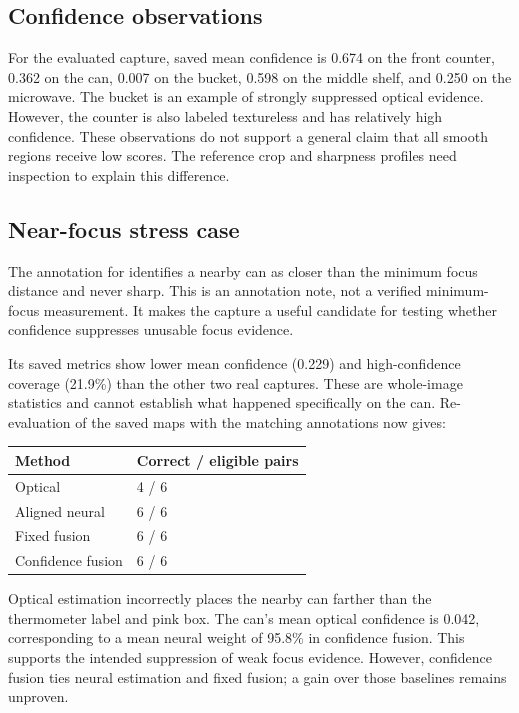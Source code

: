 \documentclass[11pt]{article}
\begin{document}
\subsection{Confidence observations}

For the evaluated capture, saved mean confidence is 0.674 on the front counter, 0.362 on the can, 0.007 on the bucket, 0.598 on the middle shelf, and 0.250 on the microwave. The bucket is an example of strongly suppressed optical evidence. However, the counter is also labeled textureless and has relatively high confidence. These observations do not support a general claim that all smooth regions receive low scores. The reference crop and sharpness profiles need inspection to explain this difference.

\subsection{Near-focus stress case}

The annotation for  identifies a nearby can as closer than the minimum focus distance and never sharp. This is an annotation note, not a verified minimum-focus measurement. It makes the capture a useful candidate for testing whether confidence suppresses unusable focus evidence.

Its saved metrics show lower mean confidence (0.229) and high-confidence coverage (21.9\%) than the other two real captures. These are whole-image statistics and cannot establish what happened specifically on the can. Re-evaluation of the saved maps with the matching annotations now gives:

\begin{center}\footnotesize\setlength{\tabcolsep}{3pt}
\begin{tabularx}{\textwidth}{XX}
\toprule
Method & Correct / eligible pairs \\
\midrule
Optical & 4 / 6 \\
Aligned neural & 6 / 6 \\
Fixed fusion & 6 / 6 \\
Confidence fusion & 6 / 6 \\
\bottomrule
\end{tabularx}\end{center}

Optical estimation incorrectly places the nearby can farther than the thermometer label and pink box. The can's mean optical confidence is 0.042, corresponding to a mean neural weight of 95.8\% in confidence fusion. This supports the intended suppression of weak focus evidence. However, confidence fusion ties neural estimation and fixed fusion; a gain over those baselines remains unproven.
\end{document}
